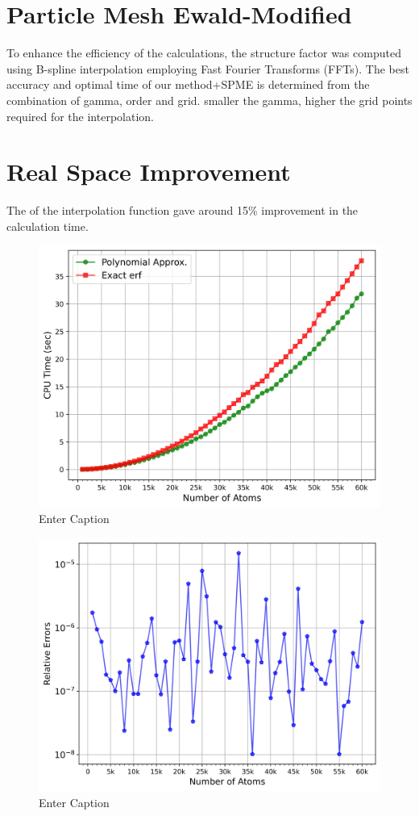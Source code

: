 \section{Particle Mesh Ewald-Modified}
To enhance the efficiency of the calculations, the structure factor was computed using B-spline interpolation employing Fast Fourier Transforms (FFTs). The best accuracy and optimal time of our method+SPME is determined from the combination of gamma, order and grid. smaller the gamma, higher the grid points required for the interpolation. 
\section{Real Space Improvement}
The of the interpolation function gave around 15\% improvement in the calculation time. 
\begin{figure}[H]
    \centering
    \includegraphics[width=0.75\linewidth]{images/realspaceopt.jpg}
    \caption{Enter Caption}
    \label{fig:enter-label}
\end{figure}
\begin{figure}[H]
    \centering
    \includegraphics[width=0.75\linewidth]{images/realspaceopterrors.jpg}
    \caption{Enter Caption}
    \label{fig:enter-label}
\end{figure}
